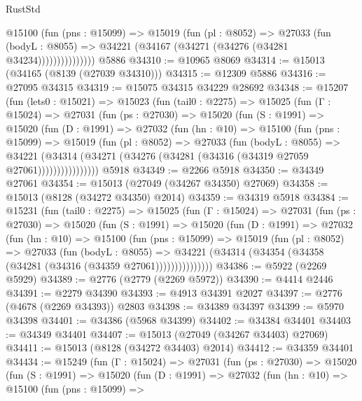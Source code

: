 \begin{lexlean}{RustStd}
\begin{coremodule}
                  @15100
                    (fun (pns : @15099) =>
                    @15019
                      (fun (pl : @8052) =>
                      @27033
                        (fun (bodyL : @8055) =>
                        @34221 (@34167 (@34271 (@34276 (@34281 @34234)))))))))))))))
    @5886
@34310 := @10965 @8069
@34314 := @15013 (@34165 (@8139 (@27039 @34310)))
@34315 := @12309 @5886
@34316 := @27095 @34315
@34319 := @15075 @34315 @34229 @28692
@34348 := @15207
    (fun (lets0 : @15021) =>
    @15023
      (fun (tail0 : @2275) =>
      @15025
        (fun (Γ : @15024) =>
        @27031
          (fun (ps : @27030) =>
          @15020
            (fun (S : @1991) =>
            @15020
              (fun (D : @1991) =>
              @27032
                (fun (hn : @10) =>
                @15100
                  (fun (pns : @15099) =>
                  @15019
                    (fun (pl : @8052) =>
                    @27033
                      (fun (bodyL : @8055) =>
                      @34221
                        (@34314
                          (@34271 (@34276 (@34281 (@34316 (@34319 @27059 @27061))))))))))))))))
    @5918
@34349 := @2266 @5918
@34350 := @34349 @27061
@34354 := @15013 (@27049 (@34267 @34350) @27069)
@34358 := @15013 (@8128 (@34272 @34350) @2014)
@34359 := @34319 @5918
@34384 := @15231
    (fun (tail0 : @2275) =>
    @15025
      (fun (Γ : @15024) =>
      @27031
        (fun (ps : @27030) =>
        @15020
          (fun (S : @1991) =>
          @15020
            (fun (D : @1991) =>
            @27032
              (fun (hn : @10) =>
              @15100
                (fun (pns : @15099) =>
                @15019
                  (fun (pl : @8052) =>
                  @27033
                    (fun (bodyL : @8055) =>
                    @34221 (@34314 (@34354 (@34358 (@34281 (@34316 (@34359 @27061)))))))))))))))
@34386 := @5922 (@2269 @5929)
@34389 := @2776 (@2779 (@2269 @5972))
@34390 := @4414 @2446
@34391 := @2279 @34390
@34393 := @4913 @34391 @2027
@34397 := @2776 (@4678 (@2269 @34393)) @2803
@34398 := @34389 @34397
@34399 := @5970 @34398
@34401 := @34386 (@5968 @34399)
@34402 := @34384 @34401
@34403 := @34349 @34401
@34407 := @15013 (@27049 (@34267 @34403) @27069)
@34411 := @15013 (@8128 (@34272 @34403) @2014)
@34412 := @34359 @34401
@34434 := @15249
    (fun (Γ : @15024) =>
    @27031
      (fun (ps : @27030) =>
      @15020
        (fun (S : @1991) =>
        @15020
          (fun (D : @1991) =>
          @27032
            (fun (hn : @10) =>
            @15100
              (fun (pns : @15099) =>

\end{coremodule}
\end{lexlean}
